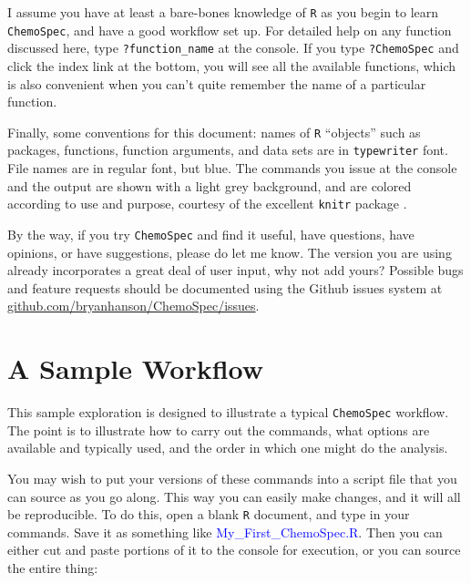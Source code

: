 \documentclass[letter,10pt,twocolumn,twoside,printwatermark=false]{pinp}
\begin{document}
I assume you have at least a bare-bones knowledge of \texttt{R} as you
begin to learn \texttt{ChemoSpec}, and have a good workflow set up. For
detailed help on any function discussed here, type
\texttt{?function\_name} at the console. If you type \texttt{?ChemoSpec}
and click the index link at the bottom, you will see all the available
functions, which is also convenient when you can't quite remember the
name of a particular function.

Finally, some conventions for this document: names of \texttt{R}
``objects'' such as packages, functions, function arguments, and data
sets are in \texttt{typewriter} font. File names are in regular font,
but blue. The commands you issue at the console and the output are shown
with a light grey background, and are colored according to use and
purpose, courtesy of the excellent \texttt{knitr} package
\citep{Xie2018}.

By the way, if you try \texttt{ChemoSpec} and find it useful, have
questions, have opinions, or have suggestions, please do let me know.
The version you are using already incorporates a great deal of user
input, why not add yours? Possible bugs and feature requests should be
documented using the Github issues system at
\href{http://github.com/bryanhanson/ChemoSpec/issues}{github.com/bryanhanson/ChemoSpec/issues}.

\hypertarget{a-sample-workflow}{%
\section{A Sample Workflow}\label{a-sample-workflow}}

This sample exploration is designed to illustrate a typical
\texttt{ChemoSpec} workflow. The point is to illustrate how to carry out
the commands, what options are available and typically used, and the
order in which one might do the analysis.

You may wish to put your versions of these commands into a script file
that you can source as you go along. This way you can easily make
changes, and it will all be reproducible. To do this, open a blank
\texttt{R} document, and type in your commands. Save it as something
like \textcolor{blue}{My\_First\_ChemoSpec.R}. Then you can either cut
and paste portions of it to the console for execution, or you can source
the entire thing:

\begin{Shaded}
\begin{Highlighting}[]
\NormalTok{(}\NormalTok{)}
\end{Highlighting}
\end{Shaded}
\end{document}
